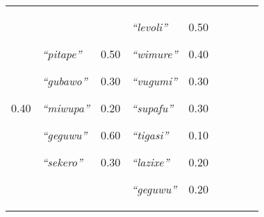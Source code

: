 {\begin{tabular}{@{}p{1.2cm}|p{1.6cm}@{}p{0.8cm}@{}|p{1.6cm}@{}p{0.8cm}@{}|p{1.6cm}@{}p{0.8cm}@{}|p{1.6cm}@{}p{0.8cm}@{}}
0.40&\textit{``pitape''}


\textit{``gubawo''}


\textit{``miwupa''}


\textit{``geguwu''}


\textit{``sekero''}
&0.50

0.30

0.20

0.60

0.30&\textit{``levoli''}


\textit{``wimure''}


\textit{``vugumi''}


\textit{``supafu''}


\textit{``tigasi''}


\textit{``lazixe''}


\textit{``geguwu''}
&0.50

0.40

0.30

0.30

0.10

0.20

0.20\\
\end{tabular}}


